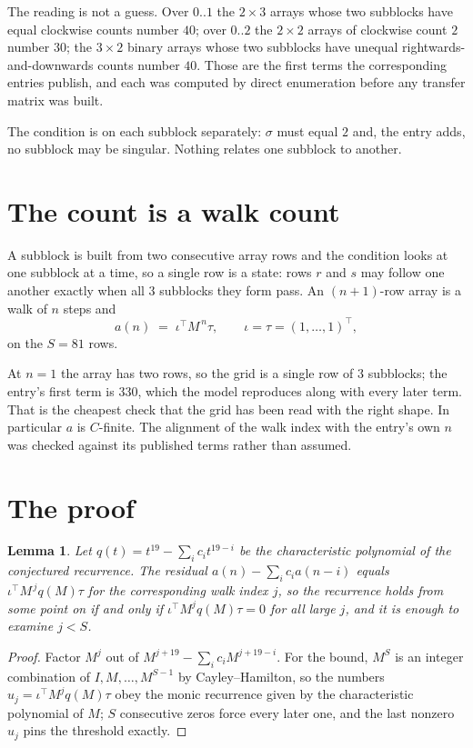 \documentclass[11pt,a4paper]{article}
\theoremstyle{plain}
\newtheorem{lemma}[theorem]{Lemma}
\theoremstyle{definition}
\begin{document}
The reading is not a guess. Over $0..1$ the $2\times3$ arrays whose two subblocks have equal
clockwise counts number $40$; over $0..2$ the $2\times2$ arrays of clockwise count $2$ number
$30$; the $3\times2$ binary arrays whose two subblocks have unequal rightwards-and-downwards
counts number $40$. Those are the first terms the corresponding entries publish, and each was
computed by direct enumeration before any transfer matrix was built.

The condition is on each subblock separately: $\sigma$ must equal $2$ and, the entry adds, no subblock may be singular. Nothing
relates one subblock to another.

\section{The count is a walk count}

A subblock is built from two consecutive array rows and the condition looks
at one subblock at a time, so a single row is a state: rows $r$ and $s$ may follow one another
exactly when all $3$ subblocks they form pass. An $(n+1)$-row array is a walk of $n$ steps and
\[
a(n)\;=\;\iota^{\!\top}M^{\,n}\tau,\qquad\iota=\tau=(1,\dots,1)^{\!\top},
\]
on the $S=81$ rows.

At $n=1$ the array has two rows, so the grid is a single row of $3$
subblocks; the entry's first term is $330$, which the model
reproduces along with every later term. That is the cheapest check that the grid has been read
with the right shape.
In particular $a$ is $C$-finite. The alignment of the walk index with the entry's own $n$ was
checked against its published terms rather than assumed.

\section{The proof}

\begin{lemma}\label{lem:crit}
Let $q(t)=t^{19}-\sum_i c_it^{19-i}$ be the characteristic polynomial of the
conjectured recurrence. The residual $a(n)-\sum_ic_ia(n-i)$ equals
$\iota^{\!\top}M^{\,j}q(M)\tau$ for the corresponding walk index $j$, so the recurrence
holds from some point on if and only if $\iota^{\!\top}M^{j}q(M)\tau=0$ for all large $j$,
and it is enough to examine $j<S$.
\end{lemma}

\begin{proof}
Factor $M^{j}$ out of $M^{j+19}-\sum_ic_iM^{j+19-i}$. For the bound, $M^{S}$
is an integer combination of $I,M,\dots,M^{S-1}$ by Cayley--Hamilton, so the numbers
$u_j=\iota^{\!\top}M^{j}q(M)\tau$ obey the monic recurrence given by the characteristic
polynomial of $M$; $S$ consecutive zeros force every later one, and the last nonzero $u_j$
pins the threshold exactly.
\end{proof}
\end{document}
